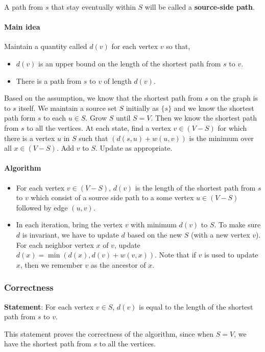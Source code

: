 A path from $s$ that stay eventually within $S$ will be called a \textbf{source-side path}.

\paragraph{Main idea}
Maintain a quantity called $d(v)$ for each vertex $v$ so that,
\begin{itemize}
	\item $d(v)$ is an upper bound on the length of the shortest path from $s$ to $v$.
	\item There is a path from $s$ to $v$ of length $d(v)$.
\end{itemize}

Based on the assumption, we know that the shortest path from $s$ on the graph is to $s$ itself. We maintain a source set $S$ initially as $\{s\}$ and we know the shortest path form $s$ to each $u \in S$. Grow $S$ until $S = V$. Then we know the shortest path from $s$ to all the vertices.
At each state, find a vertex $v \in (V-S)$ for which there is a vertex $u$ in $S$ such that $(d(s, u) + w(u, v))$ is the minimum over all $x \in (V-S)$. Add $v$ to $S$. Update as appropriate.

\paragraph{Algorithm} 
\begin{itemize}
	\item For each vertex $v \in (V-S)$, $d(v)$ is the length of the shortest path from $s$ to $v$ which consist of a source side path to a some vertex $u \in (V-S)$ followed by edge $(u,v)$.
	\item In each iteration, bring the vertex $v$ with minimum $d(v)$ to $S$. To make sure $d$ is invariant, we have to update $d$ based on the new $S$ (with a new vertex $v$). For each neighbor vertex $x$ of $v$, update $d(x) = \min(d(x), d(v) + w(v, x))$. Note that if $v$ is used to update $x$, then we remember $v$ as the ancestor of $x$.
\end{itemize}

\subsubsection{Correctness}
\textbf{Statement}: For each vertex $v \in S$, $d(v)$ is equal to the length of the shortest path from $s$ to $v$.

This statement proves the correctness of the algorithm, since when $S = V$, we have the shortest path from $s$ to all the vertices.

